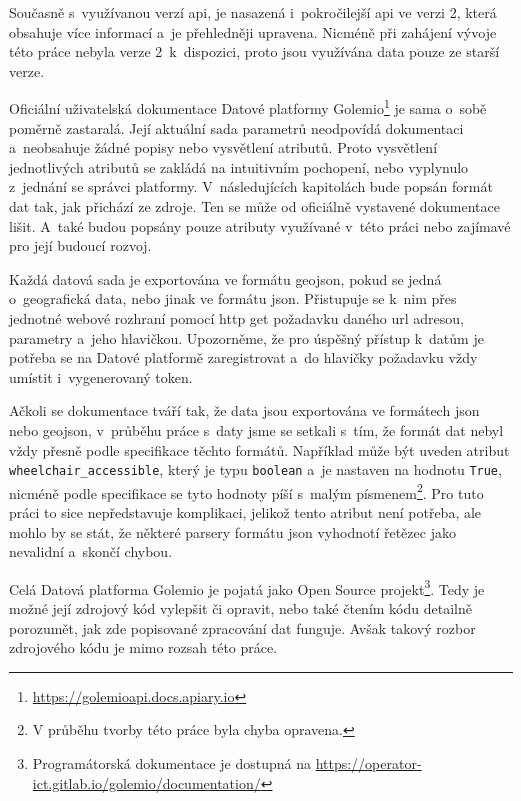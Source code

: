 \bigbreak

Současně s~využívanou verzí \gls{api}, je nasazená i~pokročilejší \gls{api} ve verzi 2, která obsahuje více informací a~je přehledněji upravena. Nicméně při zahájení vývoje této práce nebyla verze 2~k~dispozici, proto jsou využívána data pouze ze starší verze.

\bigbreak

Oficiální uživatelská dokumentace Datové platformy Golemio\footnote{\url{https://golemioapi.docs.apiary.io}} je sama o~sobě poměrně zastaralá. Její aktuální sada parametrů neodpovídá dokumentaci a~neobsahuje žádné popisy nebo vysvětlení atributů. Proto vysvětlení jednotlivých atributů se zakládá na intuitivním pochopení, nebo vyplynulo z~jednání se správci platformy. V~následujících kapitolách bude popsán formát dat tak, jak přichází ze zdroje. Ten se může od oficiálně vystavené dokumentace lišit. A~také budou popsány pouze atributy využívané v~této práci nebo zajímavé pro její budoucí rozvoj.

\bigbreak

Každá datová sada je exportována ve formátu \gls{geojson}, pokud se jedná o~geografická data, nebo jinak ve formátu \gls{json}. Přistupuje se k~nim přes jednotné webové rozhraní pomocí \gls{http} get požadavku daného \gls{url} adresou, parametry a~jeho hlavičkou. Upozorněme, že pro úspěšný přístup k~datům je potřeba se na Datové platformě zaregistrovat a~do hlavičky požadavku vždy umístit i~vygenerovaný token.

\bigbreak

Ačkoli se dokumentace tváří tak, že data jsou exportována ve formátech \gls{json} nebo \gls{geojson}, v~průběhu práce s~daty jsme se setkali s~tím, že formát dat nebyl vždy přesně podle specifikace těchto formátů. Například může být uveden atribut \verb"wheelchair_accessible", který je typu \verb"boolean" a~je nastaven na hodnotu \verb"True", nicméně podle specifikace se tyto hodnoty píší s~malým písmenem\footnote{V průběhu tvorby této práce byla chyba opravena.}. Pro tuto práci to sice nepředstavuje komplikaci, jelikož tento atribut není potřeba, ale mohlo by se stát, že některé parsery formátu \gls{json} vyhodnotí řetězec jako nevalidní a~skončí chybou.

\bigbreak

Celá Datová platforma Golemio je pojatá jako Open Source projekt\footnote{Programátorská dokumentace je dostupná na \url{https://operator-ict.gitlab.io/golemio/documentation/}}. Tedy je možné její zdrojový kód vylepšit či opravit, nebo také čtením kódu detailně porozumět, jak zde popisované zpracování dat funguje. Avšak takový rozbor zdrojového kódu je mimo rozsah této práce.

